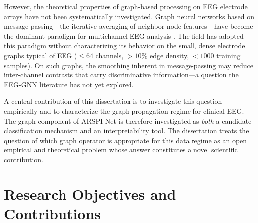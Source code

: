 However, the theoretical properties of graph-based processing on EEG electrode arrays have not been systematically investigated. Graph neural networks based on message-passing---the iterative averaging of neighbor node features---have become the dominant paradigm for multichannel EEG analysis \cite{Zhong2020EEGEmotionGCN, Song2018EEGEmotionDGCNN}. The field has adopted this paradigm without characterizing its behavior on the small, dense electrode graphs typical of EEG ($\leq 64$ channels, $> 10\%$ edge density, $< 1000$ training samples). On such graphs, the smoothing inherent in message-passing may reduce inter-channel contrasts that carry discriminative information---a question the EEG-GNN literature has not yet explored.

A central contribution of this dissertation is to investigate this question empirically and to characterize the graph propagation regime for clinical EEG. The graph component of ARSPI-Net is therefore investigated as \emph{both} a candidate classification mechanism and an interpretability tool. The dissertation treats the question of which graph operator is appropriate for this data regime as an open empirical and theoretical problem whose answer constitutes a novel scientific contribution.


\section{Research Objectives and Contributions}

